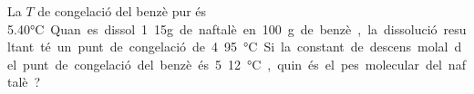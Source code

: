 \begin{qst}
La $T$ de congelació del benzè pur és 5.40\si\degreeCelsius. 
Quan es dissol 1.15g de naftalè en 100 g de benzè, la dissolució resultant té un punt de congelació de 4.95\si\degreeCelsius.
Si la constant de descens molal del punt de congelació del benzè és 5.12\si\degreeCelsius, quin és el pes molecular del naftalè?
\end{qst}
